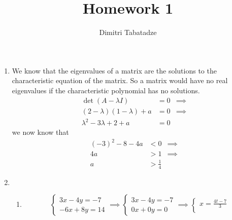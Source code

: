 \documentclass{article}
\author{Dimitri Tabatadze}
\title{Homework 1}
\begin{document}
    \maketitle

    \begin{enumerate}
        \item {
            We know that the eigenvalues of a matrix are the solutions to the characteristic equation of the matrix. So a matrix would have no real eigenvalues if the characteristic polynomial has no solutions.
            \begin{displaymath}
                \begin{aligned}
                    \det(A-\lambda I) &= 0 & \implies \\
                    (2 - \lambda)(1 - \lambda) + a &= 0 & \implies \\
                    \lambda^2 -3\lambda + 2 + a &= 0
                \end{aligned}
            \end{displaymath}
            we now know that
            \begin{displaymath}
                \begin{aligned}
                    (-3)^2 - 8 - 4a &< 0 & \implies \\
                    4a &> 1 & \implies \\
                    a &> \frac{1}{4}
                \end{aligned}
            \end{displaymath}
        }
        \item {
            \begin{enumerate}
                \item {
                    \begin{displaymath}
                        \begin{cases}
                            3x-4y=-7\\
                            -6x+8y=14
                        \end{cases}
                        \implies
                        \begin{cases}
                            3x-4y=-7\\
                            0x+0y=0
                        \end{cases}
                        \implies
                        \begin{cases}
                            x = \frac{4t - 7}{3} \\

\end{cases}
\end{displaymath}}
\end{enumerate}}
\end{enumerate}
\end{document}
